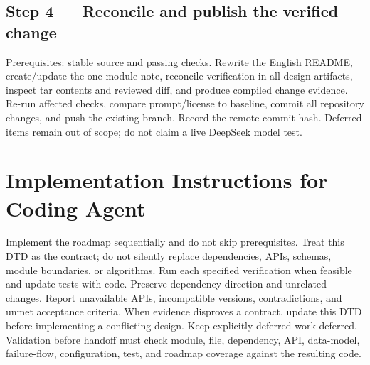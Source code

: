 \documentclass[10pt]{ltjsarticle}
\begin{document}
\subsection*{Step 4 --- Reconcile and publish the verified change}
Prerequisites: stable source and passing checks. Rewrite the English README,
create/update the one module note, reconcile verification in all design
artifacts, inspect tar contents and reviewed diff, and produce compiled
change evidence. Re-run affected checks, compare prompt/license to baseline,
commit all repository changes, and push the existing branch. Record the remote
commit hash. Deferred items remain out of scope; do not claim a live DeepSeek
model test.

\section{Implementation Instructions for Coding Agent}
Implement the roadmap sequentially and do not skip prerequisites. Treat this
DTD as the contract; do not silently replace dependencies, APIs, schemas,
module boundaries, or algorithms. Run each specified verification when
feasible and update tests with code. Preserve dependency direction and
unrelated changes. Report unavailable APIs, incompatible versions,
contradictions, and unmet acceptance criteria. When evidence disproves a
contract, update this DTD before implementing a conflicting design. Keep
explicitly deferred work deferred. Validation before handoff must check module,
file, dependency, API, data-model, failure-flow, configuration, test, and roadmap
coverage against the resulting code.
\end{document}
